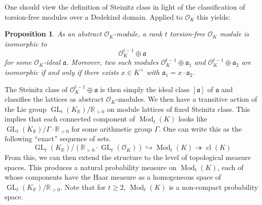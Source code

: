 \documentclass{amsart}
\newtheorem{proposition}[theorem]{Proposition}
\newcommand{\OK}{\mathcal{O}_K}
\newcommand{\KR}{K_\mathbb{R}}
\DeclareMathOperator{\ML}{Mod}
\DeclareMathOperator{\GL}{GL}
\DeclareMathOperator{\cl}{cl}
\begin{document}
One should view the definition of Steinitz class in light of the classification of torsion-free modules over a Dedekind domain. Applied to $\OK$ this yields:
\begin{proposition}
As an abstract $\OK$-module, a rank $t$ torsion-free $\OK$ module is isomorphic to 
    $$\OK^{t-1}\oplus \mathfrak{a}$$
for some $\OK$-ideal $\mathfrak{a}$. Moreover, two such modules $\OK^{t-1}\oplus \mathfrak{a}_1$ and $\OK^{t-1}\oplus \mathfrak{a}_2$ are isomorphic if and only if there exists $x\in K^\times$ with $\mathfrak{a}_1=x\cdot \mathfrak{a}_2$. 
\end{proposition}
The Steinitz class of $\OK^{t-1}\oplus \mathfrak{a}$ is then simply the ideal class $[\mathfrak{a}]$ of $\mathfrak{a}$ and classifies the lattices as abstract $\OK$-modules.  
We then have a transitive action of the Lie group $\GL_t(\KR)/\mathbb{R}_{>0}$ on module lattices of fixed Steinitz class. This implies that each connected component of $\ML_t(K)$ looks like 
$\GL_t(\KR)/\Gamma \cdot \mathbb{R}_{>0}$ for some arithmetic group $\Gamma$.
One can write this 
as the following ``exact'' sequence of sets. 
\begin{equation}
\GL_{t}(\KR)/ (\mathbb{R}_{>0} \cdot \GL_{t}(\OK)) \hookrightarrow  \ML_t(K) \twoheadrightarrow \cl(K) 
\end{equation}
From this, we can then extend the structure to the level of topological measure spaces. This produces a natural probability measure on $\ML_{t}(K)$, each of whose components have the Haar measure as a homogeneous space of $\GL_t(\KR)/\mathbb{R}_{>0}$. 
Note that for $t\geq 2$, $\ML_{t}(K)$ is a non-compact probability space.
\end{document}
